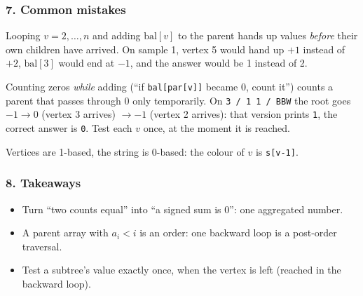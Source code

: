 \subsubsection*{7. Common mistakes}

\begin{warningbox}
Looping $v = 2, \dots, n$ and adding $\mathrm{bal}[v]$ to the parent hands up values \emph{before} their own children have arrived. On sample 1, vertex 5 would hand up $+1$ instead of $+2$, $\mathrm{bal}[3]$ would end at $-1$, and the answer would be 1 instead of 2.
\end{warningbox}

\begin{warningbox}
Counting zeros \emph{while} adding (``if \texttt{bal[par[v]]} became 0, count it'') counts a parent that passes through 0 only temporarily. On \texttt{3 / 1 1 / BBW} the root goes $-1 \to 0$ (vertex 3 arrives) $\to -1$ (vertex 2 arrives): that version prints \texttt{1}, the correct answer is \texttt{0}. Test each $v$ once, at the moment it is reached.
\end{warningbox}

\begin{warningbox}
Vertices are 1-based, the string is 0-based: the colour of $v$ is \texttt{s[v-1]}.
\end{warningbox}

\subsubsection*{8. Takeaways}

\begin{itemize}[leftmargin=*]
    \item Turn ``two counts equal'' into ``a signed sum is 0'': one aggregated number.
    \item A parent array with $a_i < i$ is an order: one backward loop is a post-order traversal.
    \item Test a subtree's value exactly once, when the vertex is left (reached in the backward loop).
\end{itemize}

